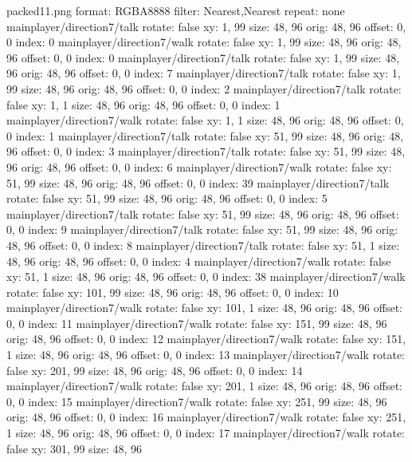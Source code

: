 packed11.png
format: RGBA8888
filter: Nearest,Nearest
repeat: none
mainplayer/direction7/talk
  rotate: false
  xy: 1, 99
  size: 48, 96
  orig: 48, 96
  offset: 0, 0
  index: 0
mainplayer/direction7/walk
  rotate: false
  xy: 1, 99
  size: 48, 96
  orig: 48, 96
  offset: 0, 0
  index: 0
mainplayer/direction7/talk
  rotate: false
  xy: 1, 99
  size: 48, 96
  orig: 48, 96
  offset: 0, 0
  index: 7
mainplayer/direction7/talk
  rotate: false
  xy: 1, 99
  size: 48, 96
  orig: 48, 96
  offset: 0, 0
  index: 2
mainplayer/direction7/talk
  rotate: false
  xy: 1, 1
  size: 48, 96
  orig: 48, 96
  offset: 0, 0
  index: 1
mainplayer/direction7/walk
  rotate: false
  xy: 1, 1
  size: 48, 96
  orig: 48, 96
  offset: 0, 0
  index: 1
mainplayer/direction7/talk
  rotate: false
  xy: 51, 99
  size: 48, 96
  orig: 48, 96
  offset: 0, 0
  index: 3
mainplayer/direction7/talk
  rotate: false
  xy: 51, 99
  size: 48, 96
  orig: 48, 96
  offset: 0, 0
  index: 6
mainplayer/direction7/walk
  rotate: false
  xy: 51, 99
  size: 48, 96
  orig: 48, 96
  offset: 0, 0
  index: 39
mainplayer/direction7/talk
  rotate: false
  xy: 51, 99
  size: 48, 96
  orig: 48, 96
  offset: 0, 0
  index: 5
mainplayer/direction7/talk
  rotate: false
  xy: 51, 99
  size: 48, 96
  orig: 48, 96
  offset: 0, 0
  index: 9
mainplayer/direction7/talk
  rotate: false
  xy: 51, 99
  size: 48, 96
  orig: 48, 96
  offset: 0, 0
  index: 8
mainplayer/direction7/talk
  rotate: false
  xy: 51, 1
  size: 48, 96
  orig: 48, 96
  offset: 0, 0
  index: 4
mainplayer/direction7/walk
  rotate: false
  xy: 51, 1
  size: 48, 96
  orig: 48, 96
  offset: 0, 0
  index: 38
mainplayer/direction7/walk
  rotate: false
  xy: 101, 99
  size: 48, 96
  orig: 48, 96
  offset: 0, 0
  index: 10
mainplayer/direction7/walk
  rotate: false
  xy: 101, 1
  size: 48, 96
  orig: 48, 96
  offset: 0, 0
  index: 11
mainplayer/direction7/walk
  rotate: false
  xy: 151, 99
  size: 48, 96
  orig: 48, 96
  offset: 0, 0
  index: 12
mainplayer/direction7/walk
  rotate: false
  xy: 151, 1
  size: 48, 96
  orig: 48, 96
  offset: 0, 0
  index: 13
mainplayer/direction7/walk
  rotate: false
  xy: 201, 99
  size: 48, 96
  orig: 48, 96
  offset: 0, 0
  index: 14
mainplayer/direction7/walk
  rotate: false
  xy: 201, 1
  size: 48, 96
  orig: 48, 96
  offset: 0, 0
  index: 15
mainplayer/direction7/walk
  rotate: false
  xy: 251, 99
  size: 48, 96
  orig: 48, 96
  offset: 0, 0
  index: 16
mainplayer/direction7/walk
  rotate: false
  xy: 251, 1
  size: 48, 96
  orig: 48, 96
  offset: 0, 0
  index: 17
mainplayer/direction7/walk
  rotate: false
  xy: 301, 99
  size: 48, 96
